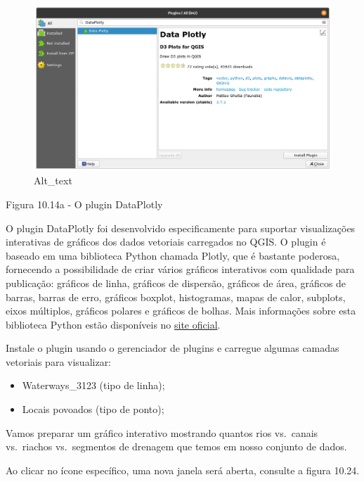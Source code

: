 \documentclass[
  portuguese,
]{krantz}
\providecommand{\tightlist}{%
  \setlength{\itemsep}{0pt}\setlength{\parskip}{0pt}}
\begin{document}
\begin{figure}
\centering
\includegraphics{media/modulo10/fig1015_a.png}
\caption{Alt\_text}
\end{figure}

Figura 10.14a - O plugin DataPlotly

O plugin DataPlotly foi desenvolvido especificamente para suportar visualizações interativas de gráficos dos dados vetoriais carregados no QGIS. O plugin é baseado em uma biblioteca Python chamada Plotly, que é bastante poderosa, fornecendo a possibilidade de criar vários gráficos interativos com qualidade para publicação: gráficos de linha, gráficos de dispersão, gráficos de área, gráficos de barras, barras de erro, gráficos boxplot, histogramas, mapas de calor, subplots, eixos múltiplos, gráficos polares e gráficos de bolhas. Mais informações sobre esta biblioteca Python estão disponíveis no \href{https://plotly.com/python/}{site oficial}.

Instale o plugin usando o gerenciador de plugins e carregue algumas camadas vetoriais para visualizar:

\begin{itemize}
\tightlist
\item
  Waterways\_3123 (tipo de linha);
\item
  Locais povoados (tipo de ponto);
\end{itemize}

Vamos preparar um gráfico interativo mostrando quantos rios vs.~canais vs.~riachos vs.~segmentos de drenagem que temos em nosso conjunto de dados.

Ao clicar no ícone específico, uma nova janela será aberta, consulte a figura 10.24.
\end{document}
